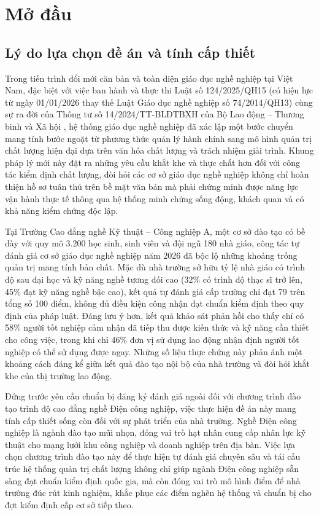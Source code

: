 \section{Mở đầu}

\subsection{Lý do lựa chọn đề án và tính cấp thiết}

Trong tiến trình đổi mới căn bản và toàn diện giáo dục nghề nghiệp tại Việt Nam, đặc biệt với việc ban hành và thực thi Luật số 124/2025/QH15 (có hiệu lực từ ngày 01/01/2026 thay thế Luật Giáo dục nghề nghiệp số 74/2014/QH13) \parencite{luatgdnn2025} cùng sự ra đời của Thông tư số 14/2024/TT-BLĐTBXH của Bộ Lao động -- Thương binh và Xã hội \parencite{bldtbxh2024}, hệ thống giáo dục nghề nghiệp đã xác lập một bước chuyển mang tính bước ngoặt từ phương thức quản lý hành chính sang mô hình quản trị chất lượng hiện đại dựa trên văn hóa chất lượng và trách nhiệm giải trình. Khung pháp lý mới này đặt ra những yêu cầu khắt khe và thực chất hơn đối với công tác kiểm định chất lượng, đòi hỏi các cơ sở giáo dục nghề nghiệp không chỉ hoàn thiện hồ sơ tuân thủ trên bề mặt văn bản mà phải chứng minh được năng lực vận hành thực tế thông qua hệ thống minh chứng sống động, khách quan và có khả năng kiểm chứng độc lập.

Tại Trường Cao đẳng nghề Kỹ thuật -- Công nghiệp A, một cơ sở đào tạo có bề dày với quy mô 3.200 học sinh, sinh viên và đội ngũ 180 nhà giáo, công tác tự đánh giá cơ sở giáo dục nghề nghiệp năm 2026 đã bộc lộ những khoảng trống quản trị mang tính bản chất. Mặc dù nhà trường sở hữu tỷ lệ nhà giáo có trình độ sau đại học và kỹ năng nghề tương đối cao (32\% có trình độ thạc sĩ trở lên, 45\% đạt kỹ năng nghề bậc cao), kết quả tự đánh giá cấp trường chỉ đạt 79 trên tổng số 100 điểm, không đủ điều kiện công nhận đạt chuẩn kiểm định theo quy định của pháp luật. Đáng lưu ý hơn, kết quả khảo sát phản hồi cho thấy chỉ có 58\% người tốt nghiệp cảm nhận đã tiếp thu được kiến thức và kỹ năng cần thiết cho công việc, trong khi chỉ 46\% đơn vị sử dụng lao động nhận định người tốt nghiệp có thể sử dụng được ngay. Những số liệu thực chứng này phản ánh một khoảng cách đáng kể giữa kết quả đào tạo nội bộ của nhà trường và đòi hỏi khắt khe của thị trường lao động.

Đứng trước yêu cầu chuẩn bị đăng ký đánh giá ngoài đối với chương trình đào tạo trình độ cao đẳng nghề Điện công nghiệp, việc thực hiện đề án này mang tính cấp thiết sống còn đối với sự phát triển của nhà trường. Nghề Điện công nghiệp là ngành đào tạo mũi nhọn, đóng vai trò hạt nhân cung cấp nhân lực kỹ thuật cho mạng lưới khu công nghiệp và doanh nghiệp trên địa bàn. Việc lựa chọn chương trình đào tạo này để thực hiện tự đánh giá chuyên sâu và tái cấu trúc hệ thống quản trị chất lượng không chỉ giúp ngành Điện công nghiệp sẵn sàng đạt chuẩn kiểm định quốc gia, mà còn đóng vai trò mô hình điểm để nhà trường đúc rút kinh nghiệm, khắc phục các điểm nghẽn hệ thống và chuẩn bị cho đợt kiểm định cấp cơ sở tiếp theo.

